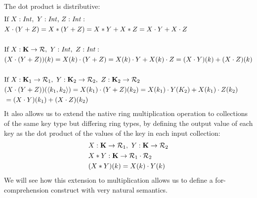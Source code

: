 {{{The dot product is distributive:
\vs\begin{equation*}
\begin{split}
& \textrm{If } X: \textrm{\textit{Int}}, \ Y: \textrm{\textit{Int}}\textrm, \ Z: \textrm{\textit{Int}}: \\
&X \cdot (Y + Z) = X * (Y + Z) = X*Y + X*Z = X \cdot Y + X \cdot Z \\ \\
& \textrm{If } X: \mathbf{K} \rightarrow \mathcal{R}, \ Y: \textrm{\textit{Int}}, \ Z: \textrm{\textit{Int}}: \\
& (X \cdot (Y+Z))(k) = X(k) \cdot (Y+Z) = X(k) \cdot Y + X(k) \cdot Z = (X \cdot Y)(k) + (X \cdot Z)(k) \\ \\
& \textrm{If } X: \mathbf{K}_1 \rightarrow \mathcal{R}_1, \ Y: \mathbf{K}_2 \rightarrow \mathcal{R}_2, \ Z: \mathbf{K}_2 \rightarrow \mathcal{R}_2 \\
& (X \cdot (Y+Z))(\langle k_1, k_2 \rangle) = X(k_1) \cdot (Y+Z)(k_2) = X(k_1) \cdot Y(K_2) + X(k_1) \cdot Z(k_2) \\
&= (X \cdot Y)(k_1) + (X \cdot Z)(k_2) 
\end{split}
\end{equation*}
It also allows us to extend the native ring multiplication operation to collections of the same key type but differing ring types, by defining the output value of each key as the dot product of the values of the key in each input collection:
\begin{equation*}
\begin{split}
& X: \mathbf{K} \rightarrow \mathcal{R}_1, \ Y: \mathbf{K} \rightarrow \mathcal{R}_2 \\
& X * Y : \mathbf{K} \rightarrow \mathcal{R}_1 \cdot \mathcal{R}_2 \\
& (X*Y)(k) = X(k) \cdot Y(k)
\end{split}
\end{equation*}
We will see how this extension to multiplication allows us to define a for-comprehension construct with very natural semantics.

}}}
